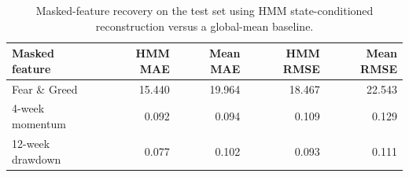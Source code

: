 \begin{table}
\caption{Masked-feature recovery on the test set using HMM state-conditioned reconstruction versus a global-mean baseline.}
\label{tab:coverup}
\begin{tabular}{lrrrr}
\toprule
Masked feature & HMM MAE & Mean MAE & HMM RMSE & Mean RMSE \\
\midrule
Fear \& Greed & 15.440 & 19.964 & 18.467 & 22.543 \\
4-week momentum & 0.092 & 0.094 & 0.109 & 0.129 \\
12-week drawdown & 0.077 & 0.102 & 0.093 & 0.111 \\
\bottomrule
\end{tabular}
\end{table}
